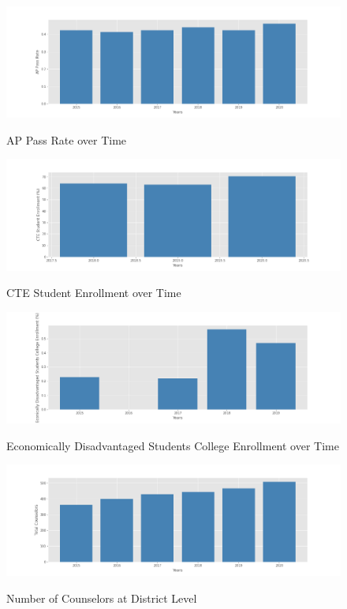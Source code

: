 \documentclass[stu, 12pt, longtable]{apa7}
\begin{document}
\begin{figure}
    \caption{AP Pass Rate over Time}
    \includegraphics[width=17cm]{AP Pass Rate.png}
    \label{fig2}
\end{figure}

\begin{figure}
    \caption{CTE Student Enrollment over Time}
    \includegraphics[width=17cm]{CTE Student Enrollment.png}
    \label{fig3}
\end{figure}

\begin{figure}
    \caption{Economically Disadvantaged Students College Enrollment over Time}
    \includegraphics[width=17cm]{EDS Students College Enrollment.png}
    \label{fig4}
\end{figure}

\begin{figure}
    \caption{Number of Counselors at District Level}
    \includegraphics[width=17cm]{Total Counselors.png}
    \label{fig5}
\end{figure}



\end{document}
